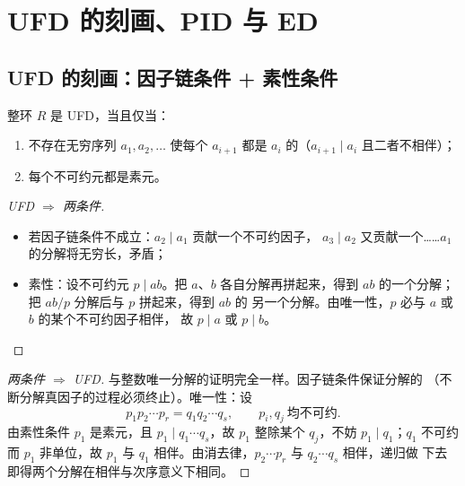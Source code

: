 \section{UFD 的刻画、PID 与 ED}\label{sec:pid-ed}

\subsection{UFD 的刻画：因子链条件 + 素性条件}

\begin{theorem}
整环 $R$ 是 UFD，当且仅当：
\begin{enumerate}[leftmargin=1.6em,itemsep=2pt]
  \item {}不存在无穷序列 $a_1, a_2, \dots$ 使每个
        $a_{i+1}$ 都是 $a_i$ 的（$a_{i+1}\mid a_i$
        且二者不相伴）；
  \item {}每个不可约元都是素元。
\end{enumerate}
\end{theorem}

\begin{proof}[UFD $\Rightarrow$ 两条件]
\leavevmode
\begin{itemize}[leftmargin=1.3em,itemsep=2pt]
  \item 若因子链条件不成立：$a_2\mid a_1$ 贡献一个不可约因子，
        $a_3\mid a_2$ 又贡献一个……$a_1$ 的分解将无穷长，矛盾；
  \item 素性：设不可约元 $p\mid ab$。把 $a$、$b$ 各自分解再拼起来，得到
        $ab$ 的一个分解；把 $ab/p$ 分解后与 $p$ 拼起来，得到 $ab$ 的
        另一个分解。由唯一性，$p$ 必与 $a$ 或 $b$ 的某个不可约因子相伴，
        故 $p\mid a$ 或 $p\mid b$。
\end{itemize}
\end{proof}

\begin{proof}[两条件 $\Rightarrow$ UFD]
与整数唯一分解的证明完全一样。因子链条件保证分解的
（不断分解真因子的过程必须终止）。唯一性：设
\[
  p_1 p_2 \cdots p_r = q_1 q_2 \cdots q_s,\qquad
  p_i, q_j\ \text{均不可约}.
\]
由素性条件 $p_1$ 是素元，且 $p_1\mid q_1\cdots q_s$，故 $p_1$ 整除某个
$q_j$，不妨 $p_1\mid q_1$；$q_1$ 不可约而 $p_1$ 非单位，故 $p_1$ 与
$q_1$ 相伴。由消去律，$p_2\cdots p_r$ 与 $q_2\cdots q_s$ 相伴，递归做
下去即得两个分解在相伴与次序意义下相同。
\end{proof}

